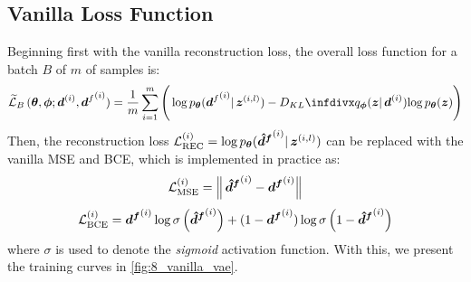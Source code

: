 \subsection{Vanilla Loss Function}
\label{sec:8_vanilla}
Beginning first with the vanilla reconstruction loss, the overall loss function for a batch $B$ of $m$ of samples is: 
\begin{equation}
    \widetilde{\loss}_B\,(\boldsymbol{\theta}, \boldsymbol{\phi}; \d^{(i)}, {\d^f}^{(i)} ) =
    \frac{1}{m} \sum_{i=1}^m
    \Bigg(
    \log \pbt ({\d^f}^{(i)} |\, \bz^{(i,l)}) 
    -
    \DKL{\qbp(\bz |\, \d^{(i)})}{\log \pbt(\bz)}
    \Bigg)
    \label{eq:8_vanilla_loss_estimator_batch}
\end{equation}
Then, the reconstruction loss $\mathcal{L}^{(i)}_{\text{REC}} = \log p_{\boldsymbol{\theta}} (\boldsymbol{\hat{d}^f}^{(i)} |\, \boldsymbol{z}^{(i,l)})$ can be replaced with the vanilla MSE and BCE, which is implemented in practice as:
\begin{equation}
    \mathcal{L}^{(i)}_{\text{MSE}} = \left\lVert\, \boldsymbol{\hat{d}^f}^{(i)} - \boldsymbol{d^f}^{(i)}\right\rVert
    \label{eq:8_mse_vanilla_loss}
\end{equation}
\begin{equation}
    \mathcal{L}^{(i)}_{\text{BCE}} =\boldsymbol{d^f}^{(i)} \log \sigma\left(\boldsymbol{\hat{d}^f}^{(i)}\right) +  (1 - \boldsymbol{d^f}^{(i)}) \log \sigma\left(1 - \boldsymbol{\hat{d}^f}^{(i)}\right)
    \label{eq:8_bce_vanilla_loss}
\end{equation}
where $\sigma$ is used to denote the \textit{sigmoid} activation function. With this, we present the training curves in \cref{fig:8_vanilla_vae}.
